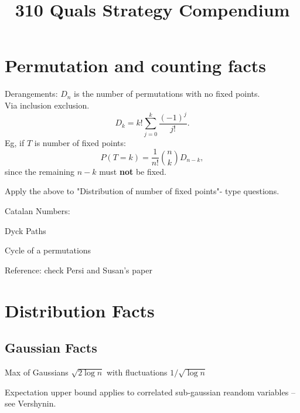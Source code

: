 \documentclass{article}
\title{310 Quals Strategy Compendium}
\begin{document}
\maketitle

\section{Permutation and counting facts}
\begin{fact}
Derangements: $D_n$ is the number of permutations with no fixed points.\\

Via inclusion exclusion.
$$D_k = k! \sum_{j=0}^{k} \frac{(-1)^j}{j!}.$$
Eg, if $T$ is number of fixed points:
$$P(T=k) = \frac{1}{n!} \binom{n}{k} D_{n-k},$$
since the remaining $n-k$ must \textbf{not} be fixed.

    
\end{fact}
Apply the above to "Distribution of number of fixed points"- type questions. 

\begin{fact}
	Catalan Numbers: 
	
		Dyck Paths 
\end{fact}

\begin{definition}[Cycles]
	Cycle of a permutations
\end{definition}

\begin{definition}[Descents]
	
\end{definition}

Reference: check Persi and Susan's paper


\section{Distribution Facts}
\subsection{Gaussian Facts}
\begin{fact}
	Max of Gaussians $\sqrt{2\log n}$ with fluctuations $1/\sqrt{\log n} $
\end{fact}
\begin{fact} 
	Expectation upper bound applies to correlated sub-gaussian reandom variables -- see Vershynin. 
\end{fact}
\begin{fact}
	
\end{fact}
\end{document}
